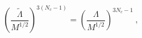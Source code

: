 \begin{equation}
\left(\frac{\tilde{\Lambda}}{M^{1/2}}\right)^{3(N_c-1)}=
\left(\frac{\Lambda}{M^{1/2}}\right)^{3N_c-1} ~,
\end{equation}


